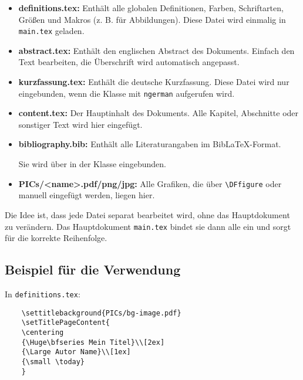 \begin{itemize}
    \item \textbf{definitions.tex:}  
    Enthält alle globalen Definitionen, Farben, Schriftarten, Größen und Makros (z. B. für Abbildungen). Diese Datei wird einmalig in \texttt{main.tex} geladen.

    \item \textbf{abstract.tex:}  
    Enthält den englischen Abstract des Dokuments. Einfach den Text bearbeiten, die Überschrift wird automatisch angepasst.

    \item \textbf{kurzfassung.tex:}  
    Enthält die deutsche Kurzfassung. Diese Datei wird nur eingebunden, wenn die Klasse mit \texttt{ngerman} aufgerufen wird.

    \item \textbf{content.tex:}  
    Der Hauptinhalt des Dokuments. Alle Kapitel, Abschnitte oder sonstiger Text wird hier eingefügt.  

    \item \textbf{bibliography.bib:}  
    Enthält alle Literaturangaben im BibLaTeX-Format. 
    
    Sie wird über \verb|| in der Klasse eingebunden.

    \item \textbf{PICs/\textless name\textgreater.pdf/png/jpg:}  
    Alle Grafiken, die über \verb|\DFfigure| oder manuell eingefügt werden, liegen hier.  
\end{itemize}

\noindent
Die Idee ist, dass jede Datei separat bearbeitet wird, ohne das Hauptdokument zu verändern. Das Hauptdokument \texttt{main.tex} bindet sie dann alle ein und sorgt für die korrekte Reihenfolge.


\clearpage

\subsection*{Beispiel für die Verwendung}


In \verb|definitions.tex|:

\begin{verbatim}
    \settitlebackground{PICs/bg-image.pdf}
    \setTitlePageContent{
    \centering
    {\Huge\bfseries Mein Titel}\\[2ex]
    {\Large Autor Name}\\[1ex]
    {\small \today}
    }
\end{verbatim}


